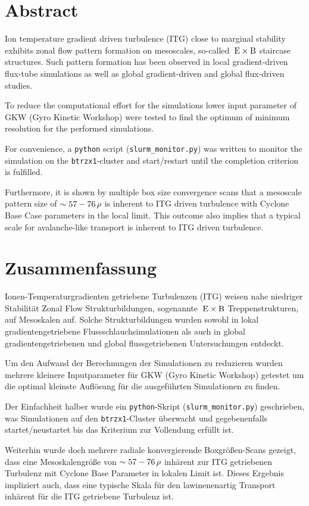 \chapter*{Abstract}
\label{chap:abstractENG}

Ion temperature gradient driven turbulence (ITG) close to marginal stability exhibits zonal flow pattern formation on mesoscales, so-called $\mathrm{\:E}\times\mathrm{B}$ staircase structures. Such pattern formation has been observed in local gradient-driven flux-tube simulations as well as global gradient-driven and global flux-driven studies. \bigskip

To reduce the computational effort for the simulations lower input parameter of GKW (Gyro Kinetic Workshop) were tested to find the optimum of minimum resolution for the performed simulations. \bigskip

For convenience, a \texttt{python} script (\texttt{slurm\_monitor.py}) was written to monitor the simulation on the \texttt{btrzx1}-cluster and start/restart until the completion criterion is fulfilled. \bigskip

Furthermore, it is shown by multiple box size convergence scans that a mesoscale pattern  size of $\sim 57-76\,\rho$ is inherent to ITG driven turbulence with Cyclone Base Case parameters in the local limit. This outcome also implies that a typical scale for avalanche-like transport is inherent to ITG driven turbulence.

\chapter*{Zusammenfassung}
\label{chap:abstractDE}

Ionen-Temperaturgradienten getriebene Turbulenzen (ITG) weisen nahe niedriger Stabilität Zonal Flow Strukturbildungen, sogenannte $\mathrm{\:E}\times\mathrm{B}$ Treppenstrukturen, auf Mesoskalen auf. Solche Strukturbildungen wurden sowohl in lokal gradientengetriebene Flussschlauchsimulationen als auch in global gradientengetriebenen und global flussgetriebenen Untersuchungen entdeckt. \bigskip

Um den Aufwand der Berechnungen der Simulationen zu reduzieren wurden mehrere kleinere Inputparameter für GKW (Gyro Kinetic Workshop) getestet um die optimal kleinste Auflösung für die ausgeführten Simulationen zu finden. \bigskip

Der Einfachheit halber wurde ein \texttt{python}-Skript (\texttt{slurm\_monitor.py}) geschrieben, was Simulationen auf den \texttt{btrzx1}-Cluster überwacht und gegebenenfalls startet/neustartet bis das Kriterium zur Vollendung erfüllt ist. \bigskip

Weiterhin wurde doch mehrere radiale konvergierende Boxgrößen-Scans gezeigt, dass eine Mesoskalengröße von $\sim 57-76\,\rho$ inhärent zur ITG getriebenen Turbulenz mit Cyclone Base Parameter in lokalen Limit ist. Dieses Ergebnis impliziert auch, dass eine typische Skala für den lawinenenartig Transport inhärent für die ITG getriebene Turbulenz ist.